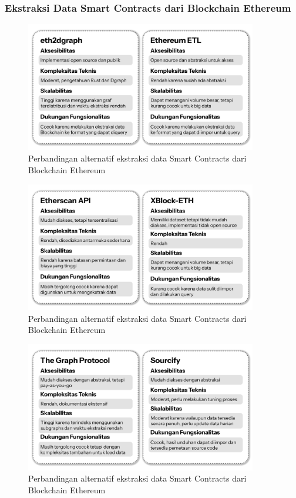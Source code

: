 \subsubsection{Ekstraksi Data Smart Contracts dari Blockchain Ethereum}

\begin{figure}[ht]
	\centering
	\includegraphics[width=0.9\textwidth]{resources/chapter-3/ekstraksi-1.png}
	\caption{Perbandingan alternatif ekstraksi data Smart Contracts dari Blockchain Ethereum}
	\label{image:perbandingan-ekstraksi-1}
\end{figure}

\begin{figure}[ht]
	\centering
	\includegraphics[width=0.9\textwidth]{resources/chapter-3/ekstraksi-2.png}
	\caption{Perbandingan alternatif ekstraksi data Smart Contracts dari Blockchain Ethereum}
	\label{image:perbandingan-ekstraksi-2}
\end{figure}

\begin{figure}[ht]
	\centering
	\includegraphics[width=0.9\textwidth]{resources/chapter-3/ekstraksi-3.png}
	\caption{Perbandingan alternatif ekstraksi data Smart Contracts dari Blockchain Ethereum}
	\label{image:perbandingan-ekstraksi-3}
\end{figure}

